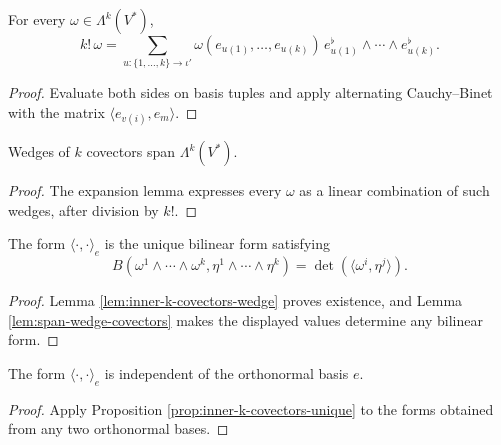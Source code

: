 \begin{lemma}
\label{lem:k-covector-wedge-expansion}





For every $\omega\in\Lambda^k(V^*)$,
\[
k!\,\omega=\sum_{u:\{1,\ldots,k\}\to\iota'}\omega(e_{u(1)},\ldots,e_{u(k)})\,e_{u(1)}^\flat\wedge\cdots\wedge e_{u(k)}^\flat.
\]
\end{lemma}
\begin{proof}

\sketch Evaluate both sides on basis tuples and apply alternating Cauchy--Binet with the matrix $\langle e_{v(i)},e_m\rangle$.
\end{proof}

\begin{lemma}
\label{lem:span-wedge-covectors}





Wedges of $k$ covectors span $\Lambda^k(V^*)$.
\end{lemma}
\begin{proof}

\sketch The expansion lemma expresses every $\omega$ as a linear combination of such wedges, after division by $k!$.
\end{proof}

\begin{proposition}
\label{prop:inner-k-covectors-unique}





The form $\langle\cdot,\cdot\rangle_e$ is the unique bilinear form satisfying
\[
B(\omega^1\wedge\cdots\wedge\omega^k,\eta^1\wedge\cdots\wedge\eta^k)=\det(\langle\omega^i,\eta^j\rangle).
\]
\end{proposition}
\begin{proof}

\sketch Lemma \ref{lem:inner-k-covectors-wedge} proves existence, and Lemma \ref{lem:span-wedge-covectors} makes the displayed values determine any bilinear form.
\end{proof}

\begin{proposition}
\label{prop:inner-k-covectors-frame-independent}





The form $\langle\cdot,\cdot\rangle_e$ is independent of the orthonormal basis $e$.
\end{proposition}
\begin{proof}

\sketch Apply Proposition \ref{prop:inner-k-covectors-unique} to the forms obtained from any two orthonormal bases.
\end{proof}

